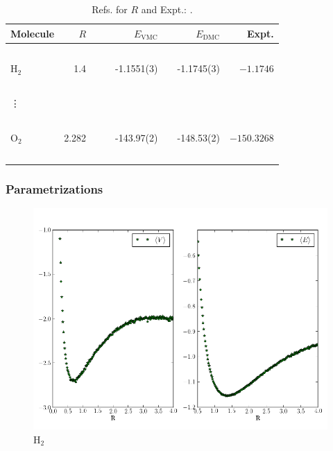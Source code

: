 \documentclass{beamer}
\begin{document}
\scriptsize
\begin{frame}
\begin{table}
\begin{center}
\begin{tabular}{lrccrlrr}
Molecule & $R$ & & \qquad & $E_\mathrm{VMC}$ & & \qquad $E_\mathrm{DMC}$ & \qquad\,\, Expt. \\
\hline\hline
\ \\
$\mathrm{H_2}$ & 1.4   & &\qquad & -1.1551(3)    & \qquad   & -1.1745(3)   & \qquad $-1.1746$   \\
\ \\
\vdots & & & & & & & \\
\ \\
$\mathrm{O_2}$ & 2.282 & &\qquad & -143.97(2)    & \qquad   & -148.53(2)   & \qquad $-150.3268$  \\
\ \\
\end{tabular}
\caption{Refs. for $R$ and Expt.: \cite{H_He_exact, UmrigarMolecules, ExactMolecules}.}
\label{tab:MoleculesRes}
\end{center}
\end{table}
\end{frame}
\normalsize



\begin{frame}\frametitle{Parametrizations}
 \begin{figure}
 \begin{center}
  \includegraphics[scale=0.35]{R_vs_E_hyd_pure.png}
  \caption{$\mathrm{H_2}$}
 \end{center}
\end{figure}
\end{frame}
\end{document}
